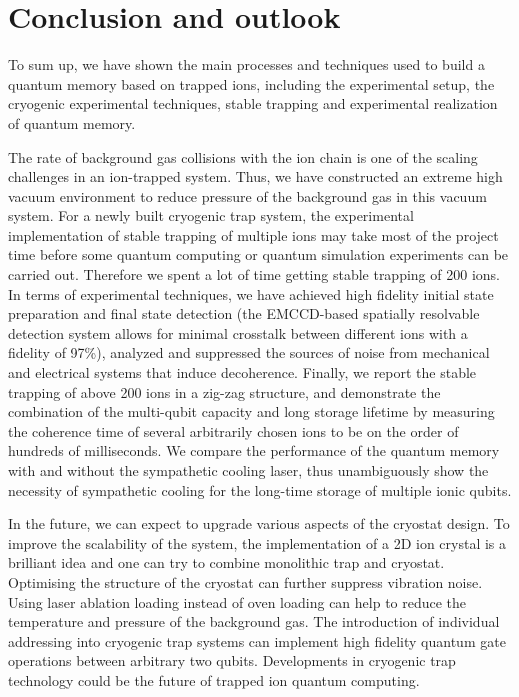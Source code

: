 
\chapter{Conclusion and outlook}

To sum up, we have shown the main processes and techniques used to build a quantum memory based on trapped ions, including the experimental setup, the cryogenic experimental techniques, stable trapping and experimental realization of quantum memory.

The rate of background gas collisions with the ion chain is one of the scaling challenges in an ion-trapped system. Thus, we have constructed an extreme high vacuum environment to reduce pressure of the background gas in this vacuum system. For a newly built cryogenic trap system, the experimental implementation of stable trapping of multiple ions may take most of the project time before some quantum computing or quantum simulation experiments can be carried out. Therefore we spent a lot of time getting stable trapping of 200 ions. In terms of experimental techniques, we have achieved high fidelity initial state preparation and final state detection (the EMCCD-based spatially resolvable detection system allows for minimal crosstalk between different ions with a fidelity of 97\%), analyzed and suppressed the sources of noise from mechanical and electrical systems that induce decoherence. Finally, we report the stable trapping of above 200 ions in a zig-zag structure, and demonstrate the combination of the multi-qubit capacity and long storage lifetime by measuring the coherence time of several arbitrarily chosen ions to be on the order of hundreds of milliseconds. We compare the performance of the quantum memory with and without the sympathetic cooling laser, thus unambiguously show the necessity of sympathetic cooling for the long-time storage of multiple ionic qubits.

In the future, we can expect to upgrade various aspects of the cryostat design. To improve the scalability of the system, the implementation of a 2D ion crystal is a brilliant idea and one can try to combine monolithic trap and cryostat. Optimising the structure of the cryostat can further suppress vibration noise. Using laser ablation loading instead of oven loading can help to reduce the temperature and pressure of the background gas. The introduction of individual addressing into cryogenic trap systems can implement high fidelity quantum gate operations between arbitrary two qubits. Developments in cryogenic trap technology could be the future of trapped ion quantum computing.
